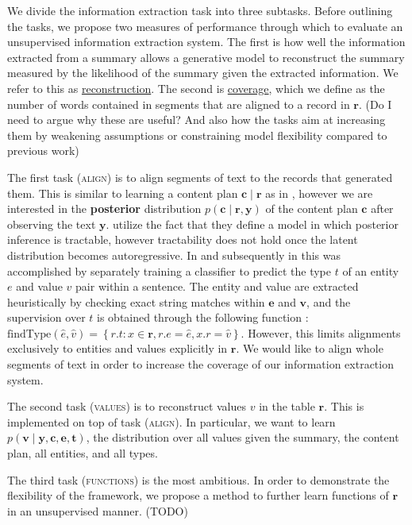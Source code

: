 \documentclass[11pt]{article}
\newcommand\set[1]{\left\{#1\right\}}
\newcommand{\bc}{\mathbf{c}}
\newcommand{\be}{\mathbf{e}}
\newcommand{\br}{\mathbf{r}}
\newcommand{\bt}{\mathbf{t}}
\newcommand{\bv}{\mathbf{v}}
\newcommand{\by}{\mathbf{y}}
\begin{document}
We divide the information extraction task into three subtasks.
Before outlining the tasks, we propose two measures of performance through which
to evaluate an unsupervised information extraction system.
The first is how well the information extracted from a summary allows a 
generative model to reconstruct the summary measured by the likelihood
of the summary given the extracted information.
We refer to this as \underline{reconstruction}.
The second is \underline{coverage}, 
which we define as the number of words contained in segments
that are aligned to a record in $\br$.
(Do I need to argue why these are useful?
And also how the tasks aim at increasing them by weakening assumptions
or constraining model flexibility compared to previous work)

The first task (\textsc{align}) is to align segments of text to the records that generated them.
This is similar to learning a content plan $\bc\mid\br$ as in \citet{puduppully2018contentselection},
however we are interested in the \textbf{posterior} distribution $p(\bc\mid\br,\by)$ of
the content plan $\bc$ after observing the text $\by$.
\citet{liang2009semalign} utilize the fact that they define a model in which posterior inference is tractable,
however tractability does not hold once the latent distribution becomes autoregressive.
In \citet{wiseman2017d2t} and subsequently in \citet{puduppully2018contentselection} this was accomplished by 
separately training a classifier to predict the type $t$ of an entity $e$ and value $v$ pair within a sentence.
The entity and value are extracted heuristically by checking exact string matches within $\be$ and $\bv$,
and the supervision over $t$ is obtained through the following function \citep{wiseman2017d2t}:
$\text{findType}(\hat{e},\hat{v}) = \set{ r.t :x\in\br, r.e = \hat{e}, x.r = \hat{v}}$.
However, this limits alignments exclusively to entities and values explicitly in $\br$.
We would like to align whole segments of text in order to increase the coverage
of our information extraction system.


The second task (\textsc{values}) is to reconstruct values $v$ in the table $\br$.
This is implemented on top of task (\textsc{align}).
In particular, we want to learn $p(\bv \mid \by,\bc,\be,\bt)$,
the distribution over all values given the summary, the content plan, all entities, and all types.

The third task (\textsc{functions}) is the most ambitious.
In order to demonstrate the flexibility of the framework,
we propose a method to further learn functions of $\br$ in an unsupervised manner.
(TODO)
\end{document}

